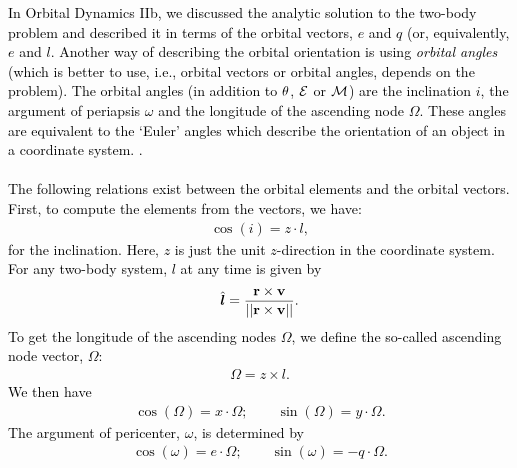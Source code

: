 \documentclass[main.tex]{subfiles}
\begin{document}
\begin{tcolorbox}[sharp corners, colback=green!30, colframe=green!80!blue, title=Box \refstepcounter{educhap3}\label{boxchap3:dynIV}\ref{boxchap3:dynIV} -- Orbital Dynamics IV]
\par \textcolor{black}{In Orbital Dynamics IIb, we discussed the analytic solution to the two-body problem and described it in terms of the orbital vectors, $\unit{e}$ and $\unit{q}$ (or, equivalently, $\unit{e}$ and $\unit{l}$. Another way of describing the orbital orientation is using {\it orbital angles} (which is better to use, i.e., orbital vectors or orbital angles, depends on the problem). The orbital angles (in addition to $\theta$, $\mathcal{E}$ or $\mathcal{M}$) are the inclination $i$, the argument of periapsis $\omega$ and the longitude of the ascending node $\Omega$. These angles are equivalent to the `Euler' angles which describe the orientation of an object in a coordinate system. . \\ \\
The following relations exist between the orbital elements and the orbital vectors. First, to compute the elements from the vectors, we have:
\begin{align}
\cos(i) = \unit{z} \cdot \unit{l},
\end{align}
for the inclination. Here, $\unit{z}$ is just the unit $z$-direction in the coordinate system. For any two-body system, $\unit{l}$ at any time is given by
\begin{align}
\hat{\boldsymbol{l}} = \frac{ {\mathbf{r}} \times {\mathbf{v}}}{||{\mathbf{r}} \times {\mathbf{v}} ||}.
\end{align}
To get the longitude of the ascending nodes $\Omega$, we define the so-called ascending node vector, $\unit{\Omega}$:
\begin{align}
\unit{\Omega} = \unit{z} \times \unit{l}.
\end{align}
We then have
\begin{align}
\cos(\Omega) = \unit{x} \cdot \unit{\Omega}; \qquad \sin(\Omega) = \unit{y} \cdot \unit{\Omega}.
\end{align}
The argument of pericenter, $\omega$, is determined by
\begin{align}
\cos(\omega) = \unit{e} \cdot \unit{\Omega}; \qquad \sin(\omega) = -\unit{q} \cdot \unit{\Omega}.
\end{align}
}
\end{tcolorbox}
\end{document}
